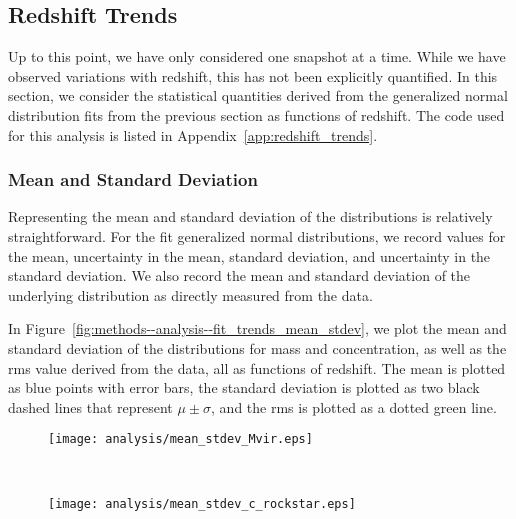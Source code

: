 \subsection{Redshift Trends}
\label{subsec:analysis--redshift_trends}


Up to this point, we have only considered one snapshot at a time.  While we have observed variations with redshift, this has not been explicitly quantified.  In this section, we consider the statistical quantities derived from the generalized normal distribution fits from the previous section as functions of redshift.  The code used for this analysis is listed in Appendix~\ref{app:redshift_trends}.



\subsubsection{Mean and Standard Deviation}
\label{subsubsec:analysis--redshift_trends--mean_stdev}


Representing the mean and standard deviation of the distributions is relatively straightforward.  For the fit generalized normal distributions, we record values for the mean, uncertainty in the mean, standard deviation, and uncertainty in the standard deviation.  We also record the mean and standard deviation of the underlying distribution as directly measured from the data.

In Figure~\ref{fig:methods--analysis--fit_trends_mean_stdev}, we plot the mean and standard deviation of the distributions for mass and concentration, as well as the rms value derived from the data, all as functions of redshift.  The mean is plotted as blue points with error bars, the standard deviation is plotted as two black dashed lines that represent $\mu \pm \sigma$, and the rms is plotted as a dotted green line.

\begin{figure*}[t]
	\centering
	\begin{subfigure}{}
		\texttt{[image: analysis/mean\_stdev\_Mvir.eps]}
	\end{subfigure}
	\\
	\begin{subfigure}{}
		\texttt{[image: analysis/mean\_stdev\_c\_rockstar.eps]}
	\end{subfigure}
	\caption[Mean, standard deviation, and rms as functions of redshift for generalized normal fits]{\footnotesize Mean, standard deviation, and rms as functions of redshift for $\Delta M_{\mathrm{vir}}$ (\textit{top}) and $\Delta c$ (\textit{bottom}).  The mean is plotted as blue points, $\mu \pm \sigma$ is plotted as the black dashed curves, and rms values are plotted as a green dotted curve.  The red dashed line is a linear fit to the mean.}
	\label{fig:methods--analysis--fit_trends_mean_stdev}
\end{figure*}

